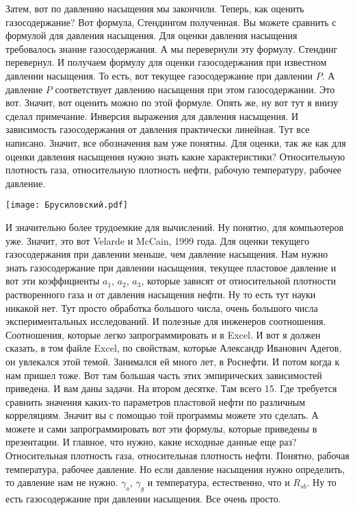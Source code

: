 \documentclass[main.tex]{subfiles}
\begin{document}
Затем, вот по давлению насыщения мы закончили.
Теперь, как оценить газосодержание?
Вот формула, Стендингом полученная.
Вы можете сравнить с формулой для давления насыщения.
Для оценки давления насыщения требовалось знание газосодержания.
А мы перевернули эту формулу.
Стендинг перевернул.
И получаем формулу для оценки газосодержания при известном давлении насыщения.
То есть, вот текущее газосодержание при давлении $P$.
А давление $P$ соответствует давлению насыщения при этом газосодержании.
Это вот.
Значит, вот оценить можно по этой формуле.
Опять же, ну вот тут я внизу сделал примечание.
Инверсия выражения для давления насыщения.
И зависимость газосодержания от давления практически линейная.
Тут все написано.
Значит, все обозначения вам уже понятны.
Для оценки, так же как для оценки давления насыщения нужно знать какие характеристики?
Относительную плотность газа, относительную плотность нефти, рабочую температуру, рабочее давление.

\begin{center}
\texttt{[image: Брусиловский.pdf]}
\end{center}

И значительно более трудоемкие для вычислений.
Ну понятно, для компьютеров уже.
Значит, это вот Velarde и McCain, 1999 года.
Для оценки текущего газосодержания при давлении меньше, чем давление насыщения.
Нам нужно знать газосодержание при давлении насыщения, текущее пластовое давление и вот эти коэффициенты $a_1$, $a_2$, $a_3$, которые зависят от относительной плотности растворенного газа и от давления насыщения нефти.
Ну то есть тут науки никакой нет.
Тут просто обработка большого числа, очень большого числа экспериментальных исследований.
И полезные для инженеров соотношения.
Соотношения, которые легко запрограммировать и в Excel.
И вот я должен сказать, в том файле Excel, по свойствам, которые Александр Иванович Адегов, он увлекался этой темой.
Занимался ей много лет, в Роснефти.
И потом когда к нам пришел тоже.
Вот там большая часть этих эмпирических зависимостей приведена.
И вам даны задачи.
На втором десятке.
Там всего 15.
Где требуется сравнить значения каких-то параметров пластовой нефти по различным корреляциям.
Значит вы с помощью той программы можете это сделать.
А можете и сами запрограммировать вот эти формулы, которые приведены в презентации.
И главное, что нужно, какие исходные данные еще раз?
Относительная плотность газа, относительная плотность нефти.
Понятно, рабочая температура, рабочее давление.
Но если давление насыщения нужно определить, то давление нам не нужно.
$\gamma_o$, $\gamma_g$ и температура, естественно, что и $R_{sb}$.
Ну то есть газосодержание при давлении насыщения.
Все очень просто.
\end{document}
